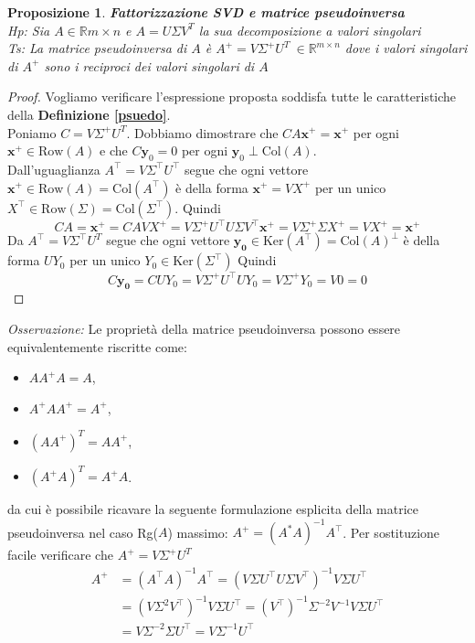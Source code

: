 \documentclass[11pt]{article}
\newtheorem{proposition}{Proposizione}
\newcommand{\R}{\mathbb{R}} %
\begin{document}
\begin{proposition}
\textbf{Fattorizzazione SVD e matrice pseudoinversa}\\
\textit{Hp:} Sia $A \in \R{m \times n}$ e $A=U\Sigma V^T$ la sua decomposizione a valori singolari\\
\textit{Ts:} La matrice pseudoinversa di $A$ è $A^+=V\Sigma^+U^T \ \in \R^{m \times n}$ dove i valori singolari di $A^+$ sono i reciproci dei valori singolari di $A$ 
\end{proposition}
\begin{proof}
Vogliamo verificare l'espressione proposta soddisfa tutte le caratteristiche della \textbf{Definizione \ref{psuedo}}.\\
Poniamo $C=V\Sigma^+U^T$. Dobbiamo dimostrare che $CA\mathbf{x}^+=\mathbf{x}^+$ per ogni $\mathbf{x}^+ \in \text{Row}(A)$ e che $C\mathbf{y}_0=0$ per ogni $\mathbf{y}_0 \perp \text{Col}(A)$.\\
Dall'uguaglianza $A^\top = V\Sigma^\top U^\top$ segue che ogni vettore $\mathbf{x}^+ \in \text{Row}(A)=\text{Col}(A^\top)$ è della forma $\mathbf{x}^+ = V X^+$ per un unico $X^\top \in \text{Row}(\Sigma)=\text{Col}(\Sigma^\top)$. Quindi\\
$$CA=\mathbf{x}^+ = CAVX^+ = V \Sigma^+ U^\top U \Sigma V^\top \mathbf{x}^+ = V \Sigma^+ \Sigma X^+ = V X^+ = \mathbf{x}^+ $$   
Da $A^\top = V\Sigma^\top U^T $ segue che ogni vettore $ \mathbf{y_0} \in \text{Ker}(A^\top)=\text{Col}(A)^\perp$ è della forma $U Y_0$ per un unico $Y_0 \in \text{Ker}(\Sigma^\top)$ Quindi
$$ C\mathbf{y_0} = CUY_0 = V\Sigma^+ U^\top U Y_0= V \Sigma^+ Y_0 = V0=0 $$
\end{proof}
\noindent
\textit{Osservazione:} Le proprietà della matrice pseudoinversa possono essere equivalentemente riscritte come:
\begin{itemize}
    \item $AA^+A=A$,
    \item $A^+AA^+=A^+$,
    \item $(AA^+)^T=AA^+$,
    \item $(A^+A)^T=A^+A$.
\end{itemize}
\noindent
da cui è possibile ricavare la seguente formulazione esplicita della matrice pseudoinversa nel caso Rg($A$) massimo: $A^+ = (A^* A)^{-1} A^\top$. Per sostituzione facile verificare che  $A^+=V\Sigma^+U^T$ 
\begin{align*}
A^+ &= (A^ \top A)^{-1}A^ \top  =(V\Sigma U^ \top U\Sigma V^ \top )^{-1} V\Sigma U^ \top  \\
    &=(V\Sigma^2 V^ \top )^{-1} V\Sigma U^ \top  =(V^ \top )^{-1} \Sigma^{-2} V^{-1} V\Sigma U^ \top  \\
    &= V \Sigma^{-2}\Sigma U^ \top  = V\Sigma^{-1}U^ \top 
\end{align*}
\end{document}
